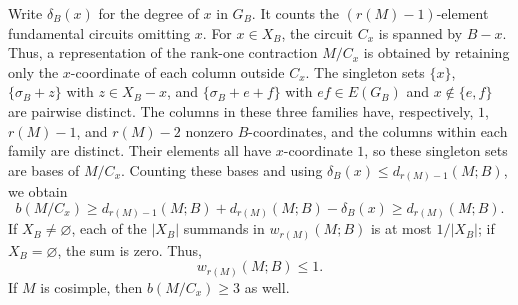 \documentclass[11pt]{article}
\numberwithin{equation}{section}
\newcommand{\wloc}[1]{w_{#1}(M;B)}
\newcommand{\dloc}[1]{d_{#1}(M;B)}
\begin{document}
Write \(\delta_B(x)\) for the degree of \(x\) in \(G_B\). It counts the \((r(M)-1)\)-element fundamental circuits omitting \(x\).
For \(x\in X_B\), the circuit \(C_x\) is spanned by \(B-x\).
Thus, a representation of the rank-one contraction \(M/C_x\)
is obtained by retaining only the \(x\)-coordinate of each column outside \(C_x\).
The singleton sets \(\{x\}\), \(\{\sigma_B+z\}\) with
\(z\in X_B-x\), and \(\{\sigma_B+e+f\}\) with
\(ef\in E(G_B)\) and \(x\notin\{e,f\}\) are pairwise distinct.
The columns in these three families have, respectively, \(1\), \(r(M)-1\), and \(r(M)-2\)
nonzero \(B\)-coordinates, and the columns within each family are distinct.
Their elements all have \(x\)-coordinate \(1\), so these singleton sets
are bases of \(M/C_x\).
Counting these bases and using \(\delta_B(x)\le\dloc{r(M)-1}\), we obtain
\begin{equation}\label{eq:rank-one-selected}
 b(M/C_x)\ge
 \dloc{r(M)-1}+\dloc{r(M)}-\delta_B(x)
 \ge\dloc{r(M)}.
\end{equation}
If \(X_B\ne\varnothing\), each of the \(|X_B|\) summands in
\(\wloc{r(M)}\) is at most \(1/|X_B|\); if \(X_B=\varnothing\),
the sum is zero. Thus,
\begin{equation}\label{eq:general-rank-one-weight}
 \wloc{r(M)}\le1.
\end{equation}
If \(M\) is cosimple, then \(b(M/C_x)\ge3\) as well.
\end{document}
